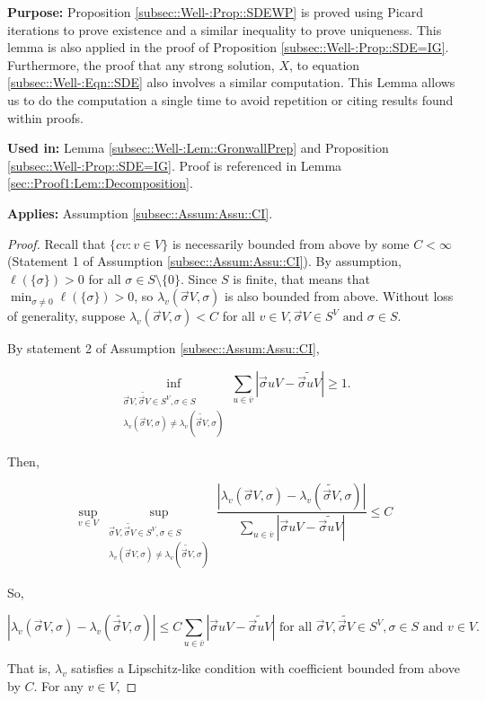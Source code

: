 \documentclass[12pt]{article}
\newcommand{\ov}{\overline}
\newcommand{\te}{\text}
\newcommand{\purpose}{\textbf{Purpose: }}
\newcommand{\usein}{\textbf{Used in: }}
\newcommand{\app}{\textbf{Applies: }}
\newcommand{\ind}{\hspace{24pt}}
\renewcommand{\v}{v}							%
\newcommand{\vv}{u}								%
\renewcommand{\S}{S}							%
\newcommand{\s}{\sigma}							%
\newcommand{\sv}{\vec{\s}}						%
\newcommand{\X}{X}								%
\newcommand{\IGr}{c}							%
\newcommand{\cl}{\ov}							%
\newcommand{\const}{C}							%
\newcommand{\XState}[1]{\S^{#1}}				%
\newcommand{\rate}[1]{\lambda_{#1}}					%
\newcommand{\Sm}{\ell}								%
\newcommand{\alt}{\widetilde}						%
\begin{document}
\purpose Proposition \ref{subsec::Well-:Prop::SDEWP} is proved using Picard iterations to prove existence and a similar inequality to prove uniqueness. This lemma is also applied in the proof of Proposition \ref{subsec::Well-:Prop::SDE=IG}. Furthermore, the proof that any strong solution, \(\X{}{}\), to equation \eqref{subsec::Well-:Eqn::SDE} also involves a similar computation. This Lemma allows us to do the computation a single time to avoid repetition or citing results found within proofs.

\usein Lemma \ref{subsec::Well-:Lem::GronwallPrep} and Proposition \ref{subsec::Well-:Prop::SDE=IG}. Proof is referenced in Lemma \ref{sec::Proof1:Lem::Decomposition}.

\app Assumption \ref{subsec::Assum:Assu::CI}.

\begin{proof}
Recall that \(\{\IGr{\v}:\v\in V\}\) is necessarily bounded from above by some \(\const{} < \infty\) (Statement 1 of Assumption \ref{subsec::Assum:Assu::CI}). By assumption, \(\Sm(\{\s\}) > 0\) for all \(\s \in \S\setminus \{0\}\). Since \(\S\) is finite, that means that \(\min_{\s \neq 0} \Sm(\{\s\}) > 0\), so \(\rate{\v}(\sv{}{ V},\s)\) is also bounded from above. Without loss of generality, suppose \(\rate{\v}(\sv{}{ V},\s) < \const{}\) for all \(\v\in  V,\sv{}{ V} \in \S^ V\te{ and } \s \in \S\).

\ind By statement 2 of Assumption \ref{subsec::Assum:Assu::CI}, 

\[\inf_{\substack{\sv{}{ V},\alt{\sv{}{ V}} \in \S^ V, \s\in \S\\ \rate{\v}(\sv{}{ V},\s) \neq \rate{\v}(\alt{\sv{}{ V}},\s)}} \sum_{\vv \in \cl{\v}} |\sv{\vv}{ V} - \alt{\sv{\vv}{ V}}| \geq 1.\]

Then,

\[\sup_{\v\in  V} \sup_{\substack{\sv{}{ V},\alt{\sv{}{ V}} \in \S^ V, \s\in \S\\ \rate{\v}(\sv{}{ V},\s) \neq \rate{\v}(\alt{\sv{}{ V}},\s)}} \frac{|\rate{\v}(\sv{}{ V},\s) - \rate{\v}(\alt{\sv{}{ V}},\s)|}{\sum_{\vv \in \cl{\v}} |\sv{\vv}{ V} - \alt{\sv{\vv}{ V}}|} \leq \const{}\]

So,

\[|\rate{\v}(\sv{}{ V},\s) - \rate{\v}(\alt{\sv{}{ V}},\s)|\leq \const{}\sum_{\vv \in \cl{\v}} |\sv{\vv}{ V} - \alt{\sv{\vv}{ V}}| \te{ for all } \sv{}{ V},\alt{\sv{}{ V}}\in \S^ V,\s\in \S\te{ and }\v\in  V.\]

That is, \(\rate{\v}\) satisfies a Lipschitz-like condition with coefficient bounded from above by \(\const{}\). For any \(\v\in  V\),


\end{proof}
\end{document}
